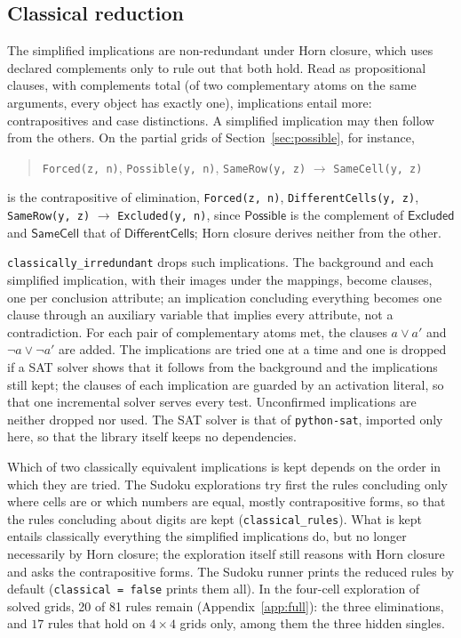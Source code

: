 \documentclass[11pt,a4paper]{article}
\theoremstyle{definition}
\theoremstyle{remark}
\newcommand{\code}[1]{\texttt{#1}}
\newcommand{\pred}[1]{\mathsf{#1}}
\begin{document}
\subsection{Classical reduction}\label{sec:classical}

The simplified implications are non-redundant under Horn closure, which uses declared complements only to rule out that both hold. Read as propositional clauses, with complements total (of two complementary atoms on the same arguments, every object has exactly one), implications entail more: contrapositives and case distinctions. A simplified implication may then follow from the others. On the partial grids of Section~\ref{sec:possible}, for instance,
\begin{quote}\small\raggedright
\texttt{Forced(z,~n)}, \allowbreak \texttt{Possible(y,~n)}, \allowbreak \texttt{SameRow(y,~z)} \;$\to$\; \texttt{SameCell(y,~z)}
\end{quote}
is the contrapositive of elimination, \texttt{Forced(z,~n)}, \allowbreak \texttt{DifferentCells(y,~z)}, \allowbreak \texttt{SameRow(y,~z)} \;$\to$\; \texttt{Excluded(y,~n)}, since $\pred{Possible}$ is the complement of $\pred{Excluded}$ and $\pred{SameCell}$ that of $\pred{DifferentCells}$; Horn closure derives neither from the other.

\code{classically\_irredundant} drops such implications. The background and each simplified implication, with their images under the mappings, become clauses, one per conclusion attribute; an implication concluding everything becomes one clause through an auxiliary variable that implies every attribute, not a contradiction. For each pair of complementary atoms met, the clauses $a \vee a'$ and $\neg a \vee \neg a'$ are added. The implications are tried one at a time and one is dropped if a SAT solver shows that it follows from the background and the implications still kept; the clauses of each implication are guarded by an activation literal, so that one incremental solver serves every test. Unconfirmed implications are neither dropped nor used. The SAT solver is that of \code{python-sat}, imported only here, so that the library itself keeps no dependencies.

Which of two classically equivalent implications is kept depends on the order in which they are tried. The Sudoku explorations try first the rules concluding only where cells are or which numbers are equal, mostly contrapositive forms, so that the rules concluding about digits are kept (\code{classical\_rules}). What is kept entails classically everything the simplified implications do, but no longer necessarily by Horn closure; the exploration itself still reasons with Horn closure and asks the contrapositive forms. The Sudoku runner prints the reduced rules by default (\code{classical = false} prints them all). In the four-cell exploration of solved grids, 20 of 81 rules remain (Appendix~\ref{app:full}): the three eliminations, and $17$ rules that hold on $4 \times 4$ grids only, among them the three hidden singles.
\end{document}
